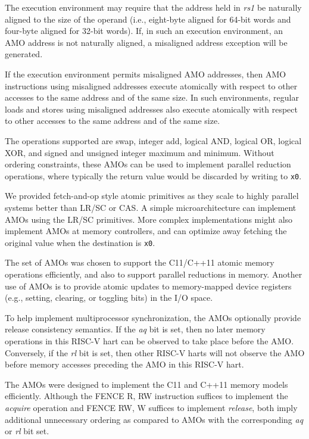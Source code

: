 The execution environment may require that the address held in {\em rs1} be
naturally aligned to the size of the operand (i.e., eight-byte aligned for
64-bit words and four-byte aligned for 32-bit words).  If, in such an execution
environment, an AMO address is not naturally aligned, a misaligned address
exception will be generated.

If the execution environment permits misaligned AMO addresses, then AMO
instructions using misaligned addresses execute atomically with respect
to other accesses to the same address and of the same size.  In such
environments, regular loads and stores using misaligned addresses also execute
atomically with respect to other accesses to the same address and of the same
size.

The operations supported are swap, integer add, logical AND, logical
OR, logical XOR, and signed and unsigned integer maximum and minimum.
Without ordering constraints, these AMOs can be used to implement
parallel reduction operations, where typically the return value would
be discarded by writing to {\tt x0}.

\begin{commentary}
We provided fetch-and-op style atomic primitives as they scale to
highly parallel systems better than LR/SC or CAS.  A simple
microarchitecture can implement AMOs using the LR/SC primitives.  More
complex implementations might also implement AMOs at memory
controllers, and can optimize away fetching the original value when
the destination is {\tt x0}.

The set of AMOs was chosen to support the C11/C++11 atomic memory
operations efficiently, and also to support parallel reductions in
memory.  Another use of AMOs is to provide atomic updates to
memory-mapped device registers (e.g., setting, clearing, or toggling
bits) in the I/O space.
\end{commentary}

To help implement multiprocessor synchronization, the AMOs optionally
provide release consistency semantics.  If the {\em aq} bit is set,
then no later memory operations in this RISC-V hart can be observed
to take place before the AMO.
Conversely, if the {\em rl} bit is set, then other
RISC-V harts will not observe the AMO before memory accesses
preceding the AMO in this RISC-V hart.

\begin{commentary}
The AMOs were designed to implement the C11 and C++11 memory models
efficiently.  Although the FENCE R, RW instruction suffices to
implement the {\em acquire} operation and FENCE RW, W suffices to
implement {\em release}, both imply additional unnecessary ordering as
compared to AMOs with the corresponding {\em aq} or {\em rl} bit set.
\end{commentary}

